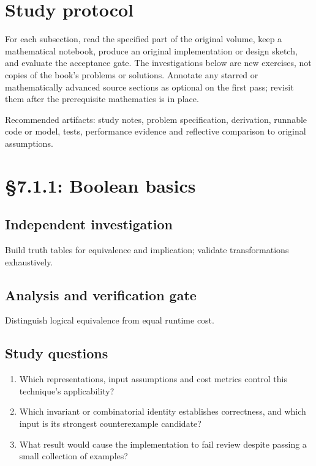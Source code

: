 \documentclass[11pt,letterpaper]{article}
\begin{document}
\tableofcontents
\clearpage
{}
\section{Study protocol}

For each subsection, read the specified part of the original volume, keep a mathematical notebook, produce an original implementation or design sketch, and evaluate the acceptance gate. The investigations below are new exercises, not copies of the book's problems or solutions. Annotate any starred or mathematically advanced source sections as optional on the first pass; revisit them after the prerequisite mathematics is in place.
\begin{evidencebox}Recommended artifacts: study notes, problem specification, derivation, runnable code or model, tests, performance evidence and reflective comparison to original assumptions.\end{evidencebox}

\section{\S 7.1.1: Boolean basics}
\subsection{Independent investigation}
Build truth tables for equivalence and implication; validate transformations exhaustively.
\subsection{Analysis and verification gate}
Distinguish logical equivalence from equal runtime cost.
\subsection{Study questions}
\begin{enumerate}
\item Which representations, input assumptions and cost metrics control this technique's applicability?
\item Which invariant or combinatorial identity establishes correctness, and which input is its strongest counterexample candidate?
\item What result would cause the implementation to fail review despite passing a small collection of examples?
\end{enumerate}
\end{document}
